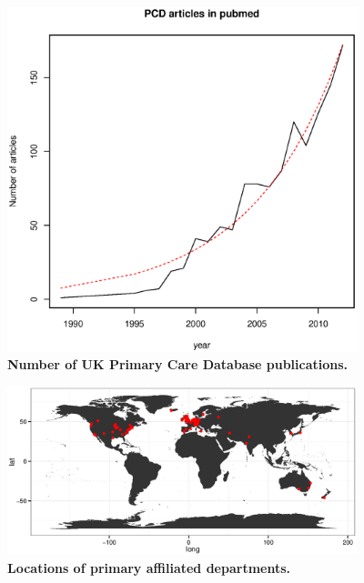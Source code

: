\documentclass[10pt]{article}
\begin{document}
\begin{figure}[!ht]
\begin{center}
\includegraphics[width=4in]{figure/articles_per_year.eps}
\end{center}
\caption{
    {\bf Number of UK Primary Care Database publications.}
}
\label{figure1_articles_per_year}
\end{figure}

\begin{figure}[!ht]
\begin{center}
  \includegraphics[width=4in]{figure/PCD_world.eps}
\end{center}
\caption{
    {\bf Locations of primary affiliated departments.}
}
\label{figure2_PCD_map}
\end{figure}
\end{document}
